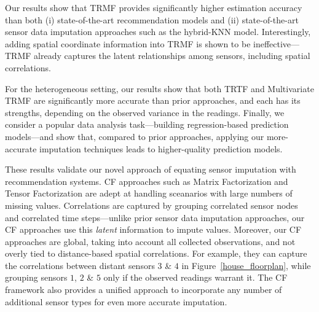 Our results show that TRMF provides significantly higher estimation accuracy than 
both (i) state-of-the-art recommendation models and (ii) state-of-the-art sensor data imputation approaches 
such as the hybrid-KNN model.
Interestingly, adding spatial coordinate information into TRMF is shown to be ineffective---TRMF already
captures the latent relationships among sensors, including spatial correlations.  

For the heterogeneous setting, our results show that both TRTF and
Multivariate TRMF are significantly more accurate than prior
approaches, and each has its strengths, depending on the observed
variance in the readings.  Finally, we consider a popular data
analysis task---building regression-based prediction models---and show
that, compared to prior approaches, applying our more-accurate
imputation techniques leads to higher-quality prediction models.

These results validate our novel approach of equating sensor
imputation with recommendation systems.  CF approaches such as Matrix
Factorization and Tensor Factorization are adept at handling
sceanarios with large numbers of missing values.  Correlations are
captured by grouping correlated sensor nodes and correlated time
steps---unlike prior sensor data imputation approaches, our CF
approaches use this {\em latent} information to impute values.
Moreover, our CF approaches are global, taking into account all
collected observations, and not overly tied to distance-based spatial
correlations.  For example, they can capture the correlations between
distant sensors $3$ \& $4$ in Figure~\ref{house_floorplan}, while
grouping sensors $1$, $2$ \& $5$ only if the observed readings warrant
it.  The CF framework also provides a unified approach to incorporate
any number of additional sensor types for even more accurate imputation.






